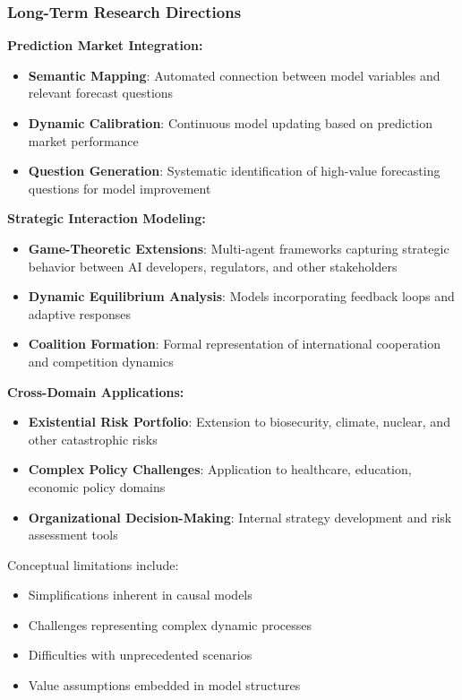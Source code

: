 \documentclass[
  11pt,
  letterpaper,
]{book}
\providecommand{\tightlist}{%
  \setlength{\itemsep}{0pt}\setlength{\parskip}{0pt}}
\begin{document}
\subsubsection{Long-Term Research
Directions}\label{sec-long-term-research2}

\textbf{Prediction Market Integration:}

\begin{itemize}
\tightlist
\item
  \textbf{Semantic Mapping}: Automated connection between model
  variables and relevant forecast questions
\item
  \textbf{Dynamic Calibration}: Continuous model updating based on
  prediction market performance
\item
  \textbf{Question Generation}: Systematic identification of high-value
  forecasting questions for model improvement
\end{itemize}

\textbf{Strategic Interaction Modeling:}

\begin{itemize}
\tightlist
\item
  \textbf{Game-Theoretic Extensions}: Multi-agent frameworks capturing
  strategic behavior between AI developers, regulators, and other
  stakeholders
\item
  \textbf{Dynamic Equilibrium Analysis}: Models incorporating feedback
  loops and adaptive responses
\item
  \textbf{Coalition Formation}: Formal representation of international
  cooperation and competition dynamics
\end{itemize}

\textbf{Cross-Domain Applications:}

\begin{itemize}
\tightlist
\item
  \textbf{Existential Risk Portfolio}: Extension to biosecurity,
  climate, nuclear, and other catastrophic risks
\item
  \textbf{Complex Policy Challenges}: Application to healthcare,
  education, economic policy domains
\item
  \textbf{Organizational Decision-Making}: Internal strategy development
  and risk assessment tools
\end{itemize}

Conceptual limitations include:

\begin{itemize}
\tightlist
\item
  Simplifications inherent in causal models
\item
  Challenges representing complex dynamic processes
\item
  Difficulties with unprecedented scenarios
\item
  Value assumptions embedded in model structures
\end{itemize}
\end{document}
